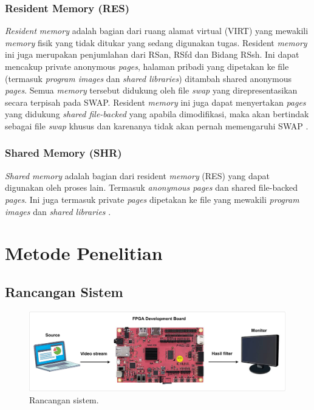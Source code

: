 \subsubsection{Resident Memory (RES)}
\textit{Resident} \textit{memory} adalah bagian dari ruang alamat virtual (VIRT) yang mewakili \textit{memory} fisik yang tidak ditukar yang sedang digunakan tugas. Resident \textit{memory} ini juga merupakan penjumlahan dari RSan, RSfd dan Bidang RSsh. Ini dapat mencakup private anonymous \textit{pages}, halaman pribadi yang dipetakan ke file (termasuk
\textit{program images} dan \textit{shared libraries}) ditambah shared anonymous \textit{pages}. Semua \textit{memory} tersebut didukung oleh file \textit{swap} yang direpresentasikan secara terpisah pada SWAP. Resident \textit{memory} ini juga dapat menyertakan \textit{pages} yang didukung \textit{shared file-backed} yang apabila dimodifikasi, maka akan bertindak sebagai file \textit{swap} khusus dan karenanya tidak akan pernah memengaruhi SWAP \cite{manual:linux}.

\subsubsection{Shared Memory (SHR)}
\textit{Shared} \textit{memory} adalah bagian dari resident \textit{memory} (RES) yang dapat digunakan oleh proses lain. Termasuk \textit{anonymous pages} dan shared file-backed \textit{pages}. Ini juga termasuk private \textit{pages} dipetakan ke file yang mewakili \textit{program images} dan \textit{shared libraries} \cite{manual:linux}. 



\section{Metode Penelitian}

\subsection{Rancangan Sistem}

\begin{figure}[ht]
    \includegraphics[width=1\linewidth, center]{images/rancangan-sistem2.png}
    \caption{Rancangan sistem.}
    \label{fig:rancangan-sistem}
\end{figure}

